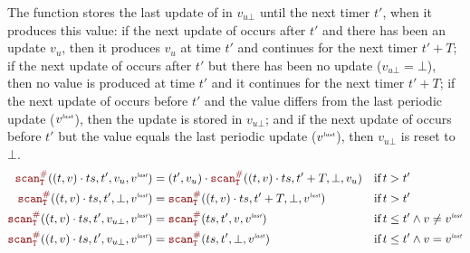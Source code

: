 The function  stores the last update of \ts in $v_{u\bot}$ until
the next timer $t'$, when it produces this value:
if the next update of \ts occurs after $t'$ and there has been an update $v_u$, then it produces
$v_u$ at time $t'$ and continues for the next timer $t' + T$;
if the next update of \ts occurs after $t'$ but there has been no update ($v_{u\bot} = \bot$), then
no value is produced at time $t'$ and it continues for the next timer $t' + T$;
if the next update of \ts occurs before $t'$ and the value differs from the last periodic update
($v^{\textit{\tiny last}}$), then the update is stored in $v_{u\bot}$; and
if the next update of \ts occurs before $t'$ but the value equals the last periodic update ($v^{\textit{\tiny last}}$),
then $v_{u\bot}$ is reset to $\bot$.
\begin{align}
    \scanAux{(t, v) \next \ts}{T}{t'}{v_u}{v^\explast}       & = (t', v_u) \next \scanAux{(t, v) \next \ts}{T}{t'+T}{\bot}{v_u} & \text{if} & \, t > t' \label{eq:semantics:grfrp:denot:op:scan:aux:1}                            \\
    \scanAux{(t, v) \next \ts}{T}{t'}{\bot}{v^\explast}      & = \scanAux{(t, v) \next \ts}{T}{t'+T}{\bot}{v^\explast}          & \text{if} & \, t > t' \label{eq:semantics:grfrp:denot:op:scan:aux:2}                            \\
    \scanAux{(t, v) \next \ts}{T}{t'}{v_{u\bot}}{v^\explast} & = \scanAux{\ts}{T}{t'}{v}{v^\explast}                            & \text{if} & \, t \le t' \wedge v \neq v^\explast \label{eq:semantics:grfrp:denot:op:scan:aux:3} \\
    \scanAux{(t, v) \next \ts}{T}{t'}{v_{u\bot}}{v^\explast} & = \scanAux{\ts}{T}{t'}{\bot}{v^\explast}                         & \text{if} & \, t \le t' \wedge v = v^\explast \label{eq:semantics:grfrp:denot:op:scan:aux:4}
\end{align}

